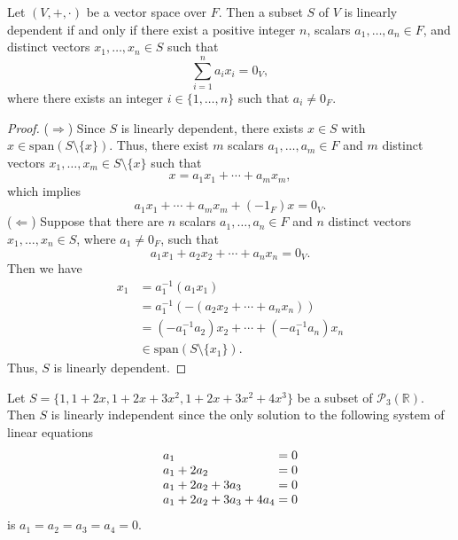 \begin{theorem}\label{thm:trivial-linear-combination}
  Let $(V, +, \cdot)$ be a vector space over $F$.
  Then a subset $S$ of $V$ is linearly dependent if and only if there
  exist a positive integer $n$,
  scalars $a_1, \dots, a_n \in F$,
  and distinct vectors $x_1, \dots, x_n \in S$ such that
  \begin{equation*}
    \sum_{i=1}^n a_ix_i = 0_V,
  \end{equation*}
  where there exists an integer $i \in \{1, \dots, n\}$ such that
  $a_i \neq 0_F$.
\end{theorem}
\begin{proof}
  ($\Rightarrow$) Since $S$ is linearly dependent, there exists
  $x \in S$ with $x \in \mathrm{span}(S \setminus \{x\})$.
  Thus, there exist $m$ scalars $a_1, \dots, a_m \in F$ and
  $m$ distinct vectors $x_1, \dots, x_m \in S \setminus \{x\}$ such that
  \begin{equation*}
    x = a_1x_1 + \cdots + a_mx_m,
  \end{equation*}
  which implies
  \begin{equation*}
    a_1x_1 + \cdots + a_mx_m + (-1_F)x = 0_V.
  \end{equation*}
  ($\Leftarrow$) Suppose that there are $n$ scalars $a_1, \dots, a_n \in F$
  and $n$ distinct vectors $x_1, \dots, x_n \in S$, where $a_1 \neq 0_F$,
  such that
  \begin{equation*}
    a_1x_1 + a_2x_2 + \cdots + a_nx_n = 0_V.
  \end{equation*}
  Then we have
  \begin{align*}
    x_1
    &= a_1^{-1}(a_1x_1) \\
    &= a_1^{-1}(-(a_2x_2 + \cdots + a_nx_n)) \\
    &= (-a_1^{-1}a_2)x_2 + \cdots + (-a_1^{-1}a_n)x_n \\
    &\in \mathrm{span}(S \setminus \{x_1\}).
  \end{align*}
  Thus, $S$ is linearly dependent.
\end{proof}

\begin{example}
  Let $S = \{1, 1+2x, 1+2x+3x^2, 1+2x+3x^2+4x^3\}$ be a subset of
  $\mathcal{P}_3(\mathbb{R})$.
  Then $S$ is linearly independent since the only solution to the
  following system of linear equations
  \begin{equation*}
    \setlength\arraycolsep{0pt}
    \begin{array}{r>{{}}c<{{}}r>{{}}c<{{}}r>{{}}c<{{}}r@{{}={}}r}
      a_1 & &      & &      & &      & 0 \\
      a_1 &+& 2a_2 & &      & &      & 0 \\
      a_1 &+& 2a_2 &+& 3a_3 & &      & 0 \\
      a_1 &+& 2a_2 &+& 3a_3 &+& 4a_4 & 0 \\
    \end{array}
  \end{equation*}
  is $a_1 = a_2 = a_3 = a_4 = 0$.
\end{example}

